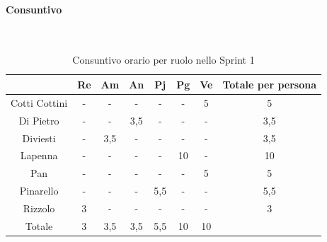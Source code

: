 \documentclass{article}
\begin{document}
                \paragraph{Consuntivo}\mbox{}\\
                \begin{table}[H]
                    \centering
                    \begin{tabular}{|c|c|c|c|c|c|c|c|}
                    \hline
                                & Re  & Am  & An  & Pj  & Pg  & Ve  & Totale per persona \\ \hline
                    Cotti Cottini & -   & -   & -   & -   & -   & 5   & 5                  \\ \hline
                    Di Pietro     & -   & -   & 3,5 & -   & -   & -   & 3,5                \\ \hline
                    Diviesti      & -   & 3,5 & -   & -   & -   & -   & 3,5                \\ \hline
                    Lapenna       & -   & -   & -   & -   & 10  & -   & 10                 \\ \hline
                    Pan           & -   & -   & -   & -   & -   & 5   & 5                  \\ \hline
                    Pinarello     & -   & -   & -   & 5,5 & -   & -   & 5,5                \\ \hline
                    Rizzolo       & 3   & -   & -   & -   & -   & -   & 3                  \\ \hline
                    Totale        & 3   & 3,5 & 3,5 & 5,5 & 10  & 10  &                    \\ \hline
                    \end{tabular}
                    \caption{Consuntivo orario per ruolo nello Sprint 1}
                \end{table}

\end{document}
